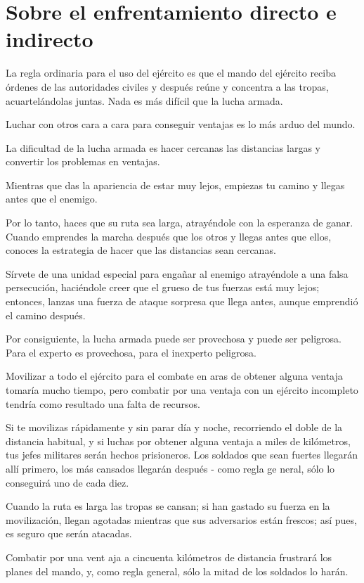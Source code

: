 \chapter{Sobre el enfrentamiento directo e indirecto}

La regla ordinaria para el uso del ejército es que el mando del ejército reciba órdenes de las autoridades civiles y después reúne y concentra a las tropas, acuartelándolas juntas. Nada es más difícil que la lucha armada.

Luchar con otros cara a cara para conseguir ventajas es lo más arduo del mundo.

La dificultad de la lucha armada es hacer cercanas las distancias largas y convertir los problemas en ventajas.

Mientras que das la apariencia de estar muy lejos, empiezas tu camino y llegas antes que el enemigo.

Por lo tanto, haces que su ruta sea larga, atrayéndole con la esperanza de ganar. Cuando emprendes la marcha después que los otros y llegas antes que ellos, conoces la estrategia de hacer que las distancias sean cercanas.

Sírvete de una unidad especial para engañar al enemigo atrayéndole a una falsa persecución, haciéndole creer que el grueso de tus fuerzas está muy lejos; entonces, lanzas una fuerza de ataque sorpresa que llega antes, aunque emprendió el camino después.

Por consiguiente, la lucha armada puede ser provechosa y puede ser peligrosa. Para el experto es provechosa, para el inexperto peligrosa.

Movilizar a todo el ejército para el combate en aras de obtener alguna ventaja tomaría mucho tiempo, pero combatir por una ventaja con un ejército incompleto tendría como resultado una falta de recursos.

Si te movilizas rápidamente y sin parar día y noche, recorriendo el doble de la distancia habitual, y si luchas por obtener alguna ventaja a miles de kilómetros, tus jefes militares serán hechos prisioneros. Los soldados que sean fuertes llegarán allí primero, los más cansados llegarán después - como regla ge neral, sólo lo conseguirá uno de cada diez.

Cuando la ruta es larga las tropas se cansan; si han gastado su fuerza en la movilización, llegan agotadas mientras que sus adversarios están frescos; así pues, es seguro que serán atacadas.

Combatir por una vent aja a cincuenta kilómetros de distancia frustrará los planes del mando, y, como regla general, sólo la mitad de los soldados lo harán.

